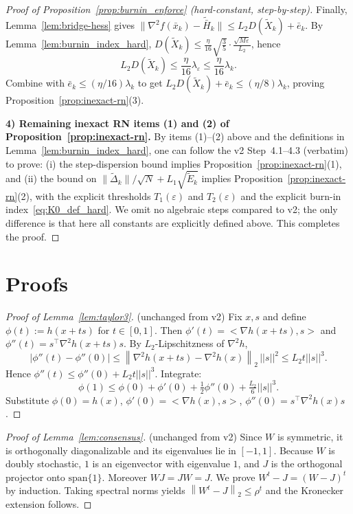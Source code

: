 \documentclass[11pt,a4paper]{article}
\def\one{1}%
\def\J{J}%
\def\norm#1{||#1||}%
\def\ip#1#2{<#1,#2>}%
\newcommand{\one}{\mathbf{1}}
\newcommand{\ip}[2]{\left\langle #1,#2\right\rangle}
\newcommand{\norm}[1]{\left\|#1\right\|}
\newcommand{\normtwo}[1]{\left\|#1\right\|_2}
\newcommand{\J}{\left(\frac{1}{N}\one\one^\top\right)}
\begin{document}
\begin{proof}[Proof of Proposition~\ref{prop:burnin_enforce} (hard-constant, step-by-step)]
	Finally, Lemma~\ref{lem:bridge-hess} gives
	$\|\nabla^2 f(\bar x_k)-\tilde{\bar H}_k\|\le L_2D(\tilde X_k)+\bar e_k$.
	By Lemma~\ref{lem:burnin_index_hard},
	$D(\tilde X_k)\le \frac{\eta}{16}\sqrt{\frac{3}{5}}\cdot\frac{\sqrt{M\varepsilon}}{L_2}$, hence
	\[
	L_2D(\tilde X_k)\le \frac{\eta}{16}\lambda_\varepsilon\le \frac{\eta}{16}\lambda_k.
	\]
	Combine with $\bar e_k\le (\eta/16)\lambda_k$ to get
	$L_2D(\tilde X_k)+\bar e_k\le (\eta/8)\lambda_k$, proving Proposition~\ref{prop:inexact-rn}(3).
	
	\smallskip
	\noindent\textbf{4) Remaining inexact RN items (1) and (2) of Proposition~\ref{prop:inexact-rn}.}
	By items (1)--(2) above and the definitions in Lemma~\ref{lem:burnin_index_hard},
	one can follow the v2 Step~4.1--4.3 (verbatim) to prove:
	(i) the step-dispersion bound implies Proposition~\ref{prop:inexact-rn}(1),
	and (ii) the bound on $\|\tilde\Delta_k\|/\sqrt N+L_1\sqrt{\tilde E_k}$ implies Proposition~\ref{prop:inexact-rn}(2),
	with the explicit thresholds $T_1(\varepsilon)$ and $T_2(\varepsilon)$ and the explicit burn-in index~\eqref{eq:K0_def_hard}.
	We omit no algebraic steps compared to v2; the only difference is that here all constants are explicitly defined above.
	This completes the proof.
\end{proof}

\section{Proofs}\label{app:proofs}
\begin{proof}[Proof of Lemma~\ref{lem:taylor3}]
	(unchanged from v2)
	Fix $x,s$ and define $\phi(t):=h(x+ts)$ for $t\in[0,1]$.
	Then $\phi'(t)=\ip{\nabla h(x+ts)}{s}$ and $\phi''(t)=s^\top\nabla^2 h(x+ts)s$.
	By $L_2$-Lipschitzness of $\nabla^2 h$,
	\[
	|\phi''(t)-\phi''(0)|
	\le \normtwo{\nabla^2 h(x+ts)-\nabla^2 h(x)}\,\norm{s}^2
	\le L_2 t\norm{s}^3.
	\]
	Hence $\phi''(t)\le \phi''(0)+L_2 t\norm{s}^3$. Integrate:
	\[
	\phi(1)\le \phi(0)+\phi'(0)+\tfrac12\phi''(0)+\tfrac{L_2}{6}\norm{s}^3.
	\]
	Substitute $\phi(0)=h(x)$, $\phi'(0)=\ip{\nabla h(x)}{s}$, $\phi''(0)=s^\top\nabla^2 h(x)s$.
\end{proof}

\begin{proof}[Proof of Lemma~\ref{lem:consensus}]
	(unchanged from v2)
	Since $W$ is symmetric, it is orthogonally diagonalizable and its eigenvalues lie in $[-1,1]$.
	Because $W$ is doubly stochastic, $\one$ is an eigenvector with eigenvalue $1$, and $\J$ is the orthogonal projector onto $\mathrm{span}\{\one\}$.
	Moreover $W\J=\J W=\J$.
	We prove $W^t-\J=(W-\J)^t$ by induction.
	Taking spectral norms yields $\normtwo{W^t-\J}\le \rho^t$ and the Kronecker extension follows.
\end{proof}
\end{document}

